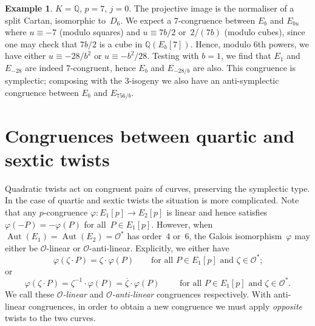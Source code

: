 \documentclass[12pt, reqno]{amsart}
\newcommand{\Q}{\mathbb{Q}}
\newcommand{\calO}{\mathcal{O}}
\DeclareMathOperator{\Aut}{Aut}
\numberwithin{equation}{section}
\theoremstyle{definition}
\newtheorem{example}[theorem]{Example}
\theoremstyle{remark}
\begin{document}
\begin{example}\label{Ex:j0p7}
$K=\Q$, $p=7$, $j=0$.  The projective image is the normaliser of a
  split Cartan, isomorphic to~$D_6$.  We expect a $7$-congruence
  between $E_b$ and $E_{bu}$ where $u\equiv-7$ (modulo squares) and
  $u\equiv 7b/2$ or~$2/(7b)$ (modulo cubes), since one may check that
  $7b/2$ is a cube in $\Q(E_b[7])$.  Hence, modulo $6$th powers, we
  have either $u\equiv -28/b^2$ or $u\equiv -b^2/28$.  Testing with
  $b=1$, we find that $E_1$ and $E_{-28}$ are indeed $7$-congruent,
  hence $E_b$ and $E_{-28/b}$ are also.  This congruence is
  symplectic; composing with the $3$-isogeny we also have an
  anti-symplectic congruence between $E_b$ and $E_{756/b}$.
\end{example}

\section{Congruences between quartic and sextic twists}\label{S:cong-twist-46}

Quadratic twists act on congruent pairs of curves, preserving the
symplectic type.  In the case of quartic and sextic twists the
situation is more complicated.  Note that any $p$-congruence
$\varphi:E_1[p]\to E_2[p]$ is linear and hence satisfies
$\varphi(-P)=-\varphi(P)$ for all~$P\in E_1[p]$.  However, when
$\Aut(E_1)=\Aut(E_2)=\calO^*$ has order~$4$ or~$6$, the Galois
isomorphism~$\varphi$ may either be $\calO$-linear or
$\calO$-anti-linear.  Explicitly, we either have
\begin{equation}\label{E:forward-congruence}
\varphi(\zeta\cdot P) = \zeta\cdot\varphi(P)
\qquad\text{for all~$P\in  E_1[p]$ and~$\zeta\in\calO^*$;}
\end{equation}
or
\begin{equation}\label{E:backward-congruence}
\varphi(\zeta\cdot P) = \zeta^{-1}\cdot\varphi(P) = \overline\zeta\cdot\varphi(P)
\qquad\text{ for all~$P\in E_1[p]$ and~$\zeta\in\calO^*$.}
\end{equation}
We call these \emph{$\calO$-linear} and \emph{$\calO$-anti-linear}
congruences respectively.  With anti-linear congruences, in order to
obtain a new congruence we must apply \emph{opposite} twists to the
two curves.
\end{document}
